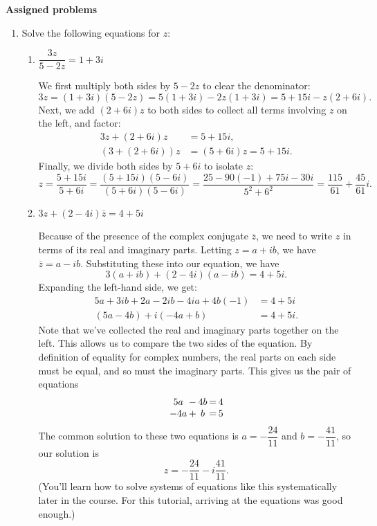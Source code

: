 \documentclass[12pt]{article}
\begin{document}
\newpage
  \textbf{Assigned problems}
  \begin{enumerate}
    \item Solve the following equations for $z$:
 
    \begin{enumerate}
    \item $\dfrac{3z}{5-2z} = 1+3i$
    
    We first multiply both sides by $5-2z$ to clear the denominator:
    \[
    3z=(1+3i)(5-2z) = 5(1+3i)-2z(1+3i)=5+15i-z(2+6i).
    \]
    Next, we add $(2+6i)z$ to both sides to collect all terms involving $z$ on the left, and factor:
    \begin{align*}
    3z+(2+6i)z & = 5+15i, \tag*{so}\\
    (3+(2+6i))z & = (5+6i)z = 5+15i.
    \end{align*}
    Finally, we divide both sides by $5+6i$ to isolate $z$:
    \[
    z = \frac{5+15i}{5+6i} = \frac{(5+15i)(5-6i)}{(5+6i)(5-6i)} = \frac{25-90(-1)+75i -30i}{5^2+6^2} = \frac{115}{61}+\frac{45}{61}i.
    \]
    
    \item $3z+(2-4i)\overline{z} = 4+5i$

    Because of the presence of the complex conjugate $\overline{z}$, we need to write $z$ in terms of its real and imaginary parts. Letting $z=a+ib$, we have $\overline{z}=a-ib$. Substituting these into our equation, we have 
    \[
    3(a+ib)+(2-4i)(a-ib)=4+5i.
    \]
    Expanding the left-hand side, we get:
    \begin{align*}
    5a+3ib+2a-2ib-4ia+4b(-1) & = 4+5i\\
    (5a-4b)+i(-4a+b) & = 4+5i.
    \end{align*}
    Note that we've collected the real and imaginary parts together on the left. This allows us to compare the two sides of the equation. By definition of equality for complex numbers, the real parts on each side must be equal, and so must the imaginary parts. This gives us the pair of equations
    \[\arraycolsep=1pt
    \begin{array}{ccccc}
    5a&-&4b&=&4\\
    -4a&+&b&=&5
    \end{array}
    \]
The common solution to these two equations is $a=-\dfrac{24}{11}$ and $b=-\dfrac{41}{11}$, so our solution is
\[
z=-\frac{24}{11}-i\frac{41}{11}.
\]
(You'll learn how to solve systems of equations like this systematically later in the course. For this tutorial, arriving at the equations was good enough.)
    \end{enumerate}
      
        
  
  \end{enumerate}\pagebreak
\end{document}
